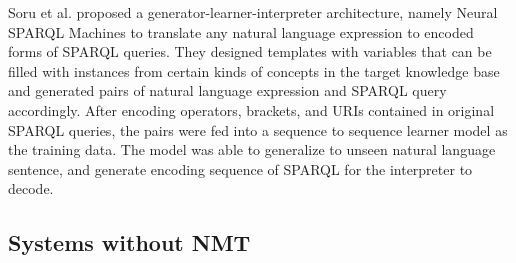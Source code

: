 Soru et al. \cite{Soru2018a,Soru2018} proposed a generator-learner-interpreter architecture, namely Neural SPARQL Machines to translate any natural language expression to encoded forms of SPARQL queries. They designed templates with variables that can be filled with instances from certain kinds of concepts in the target knowledge base and generated pairs of natural language expression and SPARQL query accordingly. After encoding operators, brackets, and URIs contained in original SPARQL queries, the pairs were fed into a sequence to sequence learner model as the training data. The model was able to generalize to unseen natural language sentence, and generate encoding sequence of SPARQL for the interpreter to decode. 

\subsection{Systems without NMT}